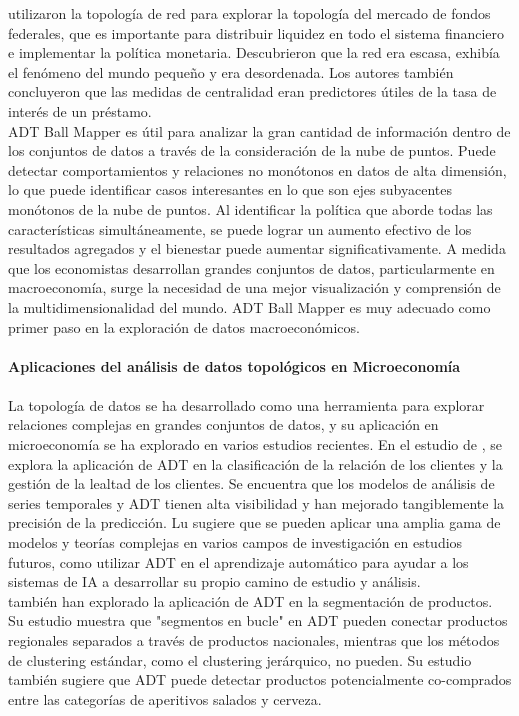 \cite{BECH20105223} utilizaron la topología de red para explorar la topología del mercado de fondos federales, que es importante para distribuir liquidez en todo el sistema financiero e implementar la política monetaria. Descubrieron que la red era escasa, exhibía el fenómeno del mundo pequeño y era desordenada. Los autores también concluyeron que las medidas de centralidad eran predictores útiles de la tasa de interés de un préstamo.\\

ADT Ball Mapper es útil para analizar la gran cantidad de información dentro de los conjuntos de datos a través de la consideración de la nube de puntos. Puede detectar comportamientos y relaciones no monótonos en datos de alta dimensión, lo que puede identificar casos interesantes en lo que son ejes subyacentes monótonos de la nube de puntos. Al identificar la política que aborde todas las características simultáneamente, se puede lograr un aumento efectivo de los resultados agregados y el bienestar puede aumentar significativamente. A medida que los economistas desarrollan grandes conjuntos de datos, particularmente en macroeconomía, surge la necesidad de una mejor visualización y comprensión de la multidimensionalidad del mundo. ADT Ball Mapper es muy adecuado como primer paso en la exploración de datos macroeconómicos.\\\\


\textbf{Aplicaciones del análisis de datos topológicos en Microeconomía}\\\\

La topología de datos se ha desarrollado como una herramienta para explorar relaciones complejas en grandes conjuntos de datos, y su aplicación en microeconomía se ha explorado en varios estudios recientes. En el estudio de \cite{Lu_2020}, se explora la aplicación de ADT en la clasificación de la relación de los clientes y la gestión de la lealtad de los clientes. Se encuentra que los modelos de análisis de series temporales y ADT tienen alta visibilidad y han mejorado tangiblemente la precisión de la predicción. Lu sugiere que se pueden aplicar una amplia gama de modelos y teorías complejas en varios campos de investigación en estudios futuros, como utilizar ADT en el aprendizaje automático para ayudar a los sistemas de IA a desarrollar su propio camino de estudio y análisis.\\

\cite{goldfarb2016detecting} también han explorado la aplicación de ADT en la segmentación de productos. Su estudio muestra que "segmentos en bucle" en ADT pueden conectar productos regionales separados a través de productos nacionales, mientras que los métodos de clustering estándar, como el clustering jerárquico, no pueden. Su estudio también sugiere que ADT puede detectar productos potencialmente co-comprados entre las categorías de aperitivos salados y cerveza.\\

